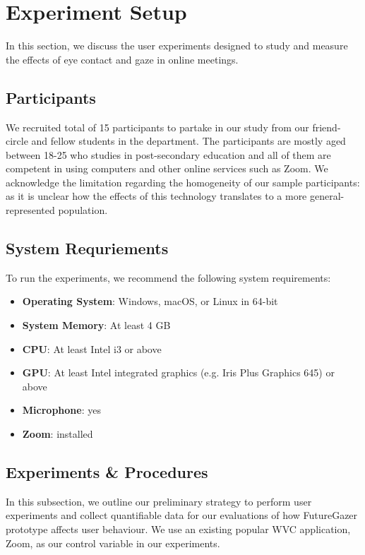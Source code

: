 \section{Experiment Setup}\label{section:exp}

In this section, we discuss the user experiments designed to study and measure the effects of eye contact and gaze in online meetings. 

\subsection{Participants}

We recruited total of 15 participants to partake in our study from our friend-circle and fellow students in the department.
The participants are mostly aged between 18-25 who studies in post-secondary education and all of them are competent in using computers
and other online services such as Zoom. 
We acknowledge the limitation regarding the homogeneity of our sample participants: as it is unclear
how the effects of this technology translates to a more general-represented population.

\subsection{System Requriements}

To run the experiments, we recommend the following system requirements:

\begin{itemize}
    \item \textbf{Operating System}: Windows, macOS, or Linux in 64-bit
    \item \textbf{System Memory}: At least 4 GB
    \item \textbf{CPU}: At least Intel i3 or above
    \item \textbf{GPU}: At least Intel integrated graphics (e.g. Iris Plus Graphics 645) or above
    \item \textbf{Microphone}: yes
    \item \textbf{Zoom}: installed
\end{itemize}

\subsection{Experiments \& Procedures}\label{section:exp-proc}

In this subsection, we outline our preliminary strategy to perform user experiments and collect quantifiable data for our evaluations of how FutureGazer prototype affects user behaviour. We use an existing popular WVC application, Zoom, as our control variable in our experiments. 

